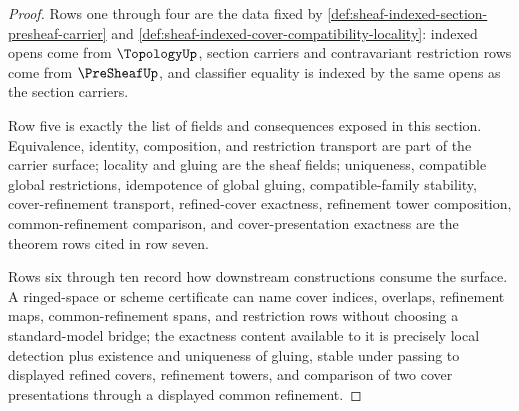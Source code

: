 \begin{proof}
Rows one through four are the data fixed by \autoref{def:sheaf-indexed-section-presheaf-carrier} and \autoref{def:sheaf-indexed-cover-compatibility-locality}: indexed opens come from $\TopologyUp$, section carriers and contravariant restriction rows come from $\PreSheafUp$, and classifier equality is indexed by the same opens as the section carriers.

Row five is exactly the list of fields and consequences exposed in this section. Equivalence, identity, composition, and restriction transport are part of the carrier surface; locality and gluing are the sheaf fields; uniqueness, compatible global restrictions, idempotence of global gluing, compatible-family stability, cover-refinement transport, refined-cover exactness, refinement tower composition, common-refinement comparison, and cover-presentation exactness are the theorem rows cited in row seven.

Rows six through ten record how downstream constructions consume the surface. A ringed-space or scheme certificate can name cover indices, overlaps, refinement maps, common-refinement spans, and restriction rows without choosing a standard-model bridge; the exactness content available to it is precisely local detection plus existence and uniqueness of gluing, stable under passing to displayed refined covers, refinement towers, and comparison of two cover presentations through a displayed common refinement.
\end{proof}

